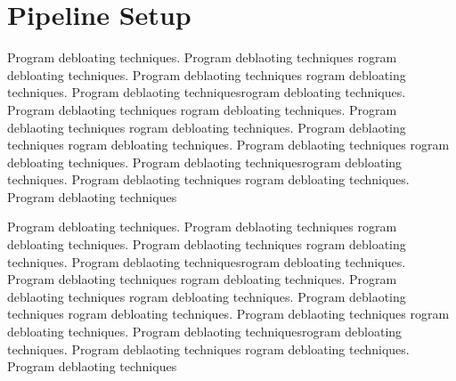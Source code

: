 \documentclass{relatorio}
\begin{document}
\section{Pipeline Setup}%
\label{Tools}

Program debloating techniques. Program deblaoting techniques rogram debloating techniques. Program deblaoting techniques
rogram debloating techniques. Program deblaoting techniquesrogram debloating techniques. Program deblaoting techniques
rogram debloating techniques. Program deblaoting techniques rogram debloating techniques. Program deblaoting techniques
rogram debloating techniques. Program deblaoting techniques 
rogram debloating techniques. Program deblaoting techniquesrogram debloating techniques. Program deblaoting techniques
rogram debloating techniques. Program deblaoting techniques

Program debloating techniques. Program deblaoting techniques rogram debloating techniques. Program deblaoting techniques
rogram debloating techniques. Program deblaoting techniquesrogram debloating techniques. Program deblaoting techniques
rogram debloating techniques. Program deblaoting techniques rogram debloating techniques. Program deblaoting techniques
rogram debloating techniques. Program deblaoting techniques 
rogram debloating techniques. Program deblaoting techniquesrogram debloating techniques. Program deblaoting techniques
rogram debloating techniques. Program deblaoting techniques
\end{document}
